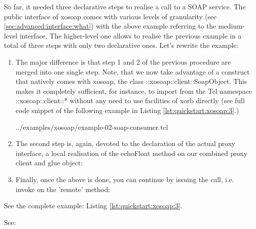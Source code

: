 So far, it needed three declarative steps to realise a call to a SOAP service. The public interface of 
xosoap comes with various levels of granularity (see \ref{sec:advanced:interface:what}) with the above 
example referring to the medium-level interface. The higher-level one allows to realise the previous 
example in a total of three steps with only two declarative ones. Let's rewrite the example:

\begin{enumerate}
\item The major difference is that step 1 and 2 of the previous procedure are merged into one single 
step. Note, that we now take advantage of a construct that natively comes with xosoap, the 
class ::xosoap::client::SoapObject. This makes it completely sufficient, for instance, to import from the Tcl 
namespace ::xosoap::client::* without any need to use facilities of xorb directly (see full code snippet of 
the following example in Listing \ref{lst:quickstart:xosoap:3}.)

{../examples/xosoap/example-02-soap-consumer.tcl}
\item The second step is, again, devoted to the declaration of the actual proxy interface, a local 
realisation of the echoFloat method on our combined proxy client and glue object:

\item Finally, once the above is done, you can continue by issuing the call, i.e. invoke on the 'remote' 
method:

\end{enumerate}

 \begin{hints}
\item See the complete example: Listing \ref{lst:quickstart:xosoap:3}.
\item See: 
\end{hints}

  
